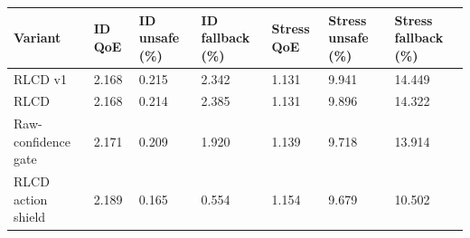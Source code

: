 \begin{tabular}{lllllll}
\toprule
Variant & ID QoE & ID unsafe (\%) & ID fallback (\%) & Stress QoE & Stress unsafe (\%) & Stress fallback (\%) \\
\midrule
RLCD v1 & 2.168 & 0.215 & 2.342 & 1.131 & 9.941 & 14.449 \\
RLCD & 2.168 & 0.214 & 2.385 & 1.131 & 9.896 & 14.322 \\
Raw-confidence gate & 2.171 & 0.209 & 1.920 & 1.139 & 9.718 & 13.914 \\
RLCD action shield & 2.189 & 0.165 & 0.554 & 1.154 & 9.679 & 10.502 \\
\bottomrule
\end{tabular}
